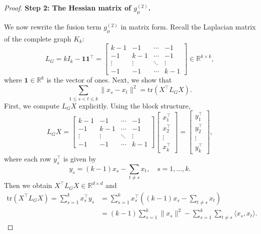 \documentclass[11pt]{article}
\theoremstyle{definition}
\newcommand{\R}{\mathbb{R}}
\newcommand{\1}{\mathbf{1}}
\begin{document}
\begin{proof}
\medskip
\noindent\textbf{Step 2: The Hessian matrix of $g_\mu^{(2)}$.}

We now rewrite the fusion term $g_\mu^{(2)}$ in matrix form. Recall the Laplacian matrix of the complete graph $K_k$:
\[
L_G = k I_k - \mathbf{1}\mathbf{1}^\top
=
\begin{bmatrix}
k-1 & -1 & \cdots & -1 \\
-1 & k-1 & \cdots & -1 \\
\vdots & \vdots & \ddots & \vdots \\
-1 & -1 & \cdots & k-1
\end{bmatrix}
\in \R^{k\times k},
\]
where $\mathbf{1} \in \R^k$ is the vector of ones.
Next, we show that
\begin{equation}\label{eq:fusion-trace}
\sum_{1\le s<t\le k} \|x_s - x_t\|^2 = \mathrm{tr}(X^\top L_G X).
\end{equation}
First, we compute $L_G X$ explicitly. Using the block structure,
\[
L_G X
=
\begin{bmatrix}
k-1 & -1 & \cdots & -1 \\
-1 & k-1 & \cdots & -1 \\
\vdots & \vdots & \ddots & \vdots \\
-1 & -1 & \cdots & k-1
\end{bmatrix}
\begin{bmatrix}
x_1^\top  \\
 x_2^\top  \\
\vdots  \\
 x_k^\top 
\end{bmatrix}
=
\begin{bmatrix}
 y_1^\top  \\
 y_2^\top  \\
\vdots \\
 y_k^\top 
\end{bmatrix},
\]
where each row $y_s^\top$ is given by
\[
y_s = (k-1)x_s - \sum_{t\neq s} x_t, \quad s=1,\dots,k.
\]
Then we obtain
$X^\top L_G X \in \R^{d\times d}$
and
\begin{align*}
\mathrm{tr}(X^\top L_G X)
= \sum_{s=1}^k x_s^\top y_s
&= \sum_{s=1}^k x_s^\top\left((k-1)x_s - \sum_{t\neq s} x_t\right)\\ 
&= (k-1)\sum_{s=1}^k \|x_s\|^2 - \sum_{s=1}^k \sum_{t\neq s} \langle x_s, x_t\rangle.
\end{align*}



\end{proof}
\end{document}
